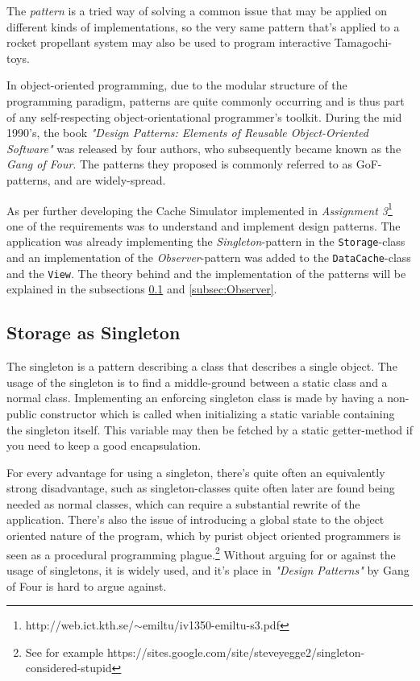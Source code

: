 \documentclass[a4paper]{scrreprt}
\begin{document}
The \textit{pattern} is a tried way of solving a common issue that may be applied on different kinds of implementations, so the very same pattern that's applied to a rocket propellant system may also be used to program interactive Tamagochi-toys.

In object-oriented programming, due to the modular structure of the programming paradigm, patterns are quite commonly occurring and is thus part of any self-respecting object-orientational programmer's toolkit. During the mid 1990's, the book \textit{"Design Patterns: Elements of Reusable Object-Oriented Software"} was released by four authors, who subsequently became known as the \textit{Gang of Four}. The patterns they proposed is commonly referred to as GoF-patterns, and are widely-spread.

As per further developing the Cache Simulator implemented in \textit{Assignment 3}\footnote{http://web.ict.kth.se/$\sim$emiltu/iv1350-emiltu-s3.pdf} one of the requirements was to understand and implement design patterns. The application was already implementing the \textit{Singleton}-pattern in the \texttt{Storage}-class and an implementation of the \textit{Observer}-pattern was added to the \texttt{DataCache}-class and the \texttt{View}. The theory behind and the implementation of the patterns will be explained in the subsections \ref{subsec:Singleton} and \ref{subsec:Observer}.

\subsection{Storage as Singleton}
\label{subsec:Singleton}

The singleton is a pattern describing a class that describes a single object. The usage of the singleton is to find a middle-ground between a static class and a normal class. Implementing an enforcing singleton class is made by having a non-public constructor which is called when initializing a static variable containing the singleton itself. This variable may then be fetched by a static getter-method if you need to keep a good encapsulation.

For every advantage for using a singleton, there's quite often an equivalently strong disadvantage, such as singleton-classes quite often later are found being needed as normal classes, which can require a substantial rewrite of the application. There's also the issue of introducing a global state to the object oriented nature of the program, which by purist object oriented programmers is seen as a procedural programming plague.\footnote{See for example https://sites.google.com/site/steveyegge2/singleton-considered-stupid} Without arguing for or against the usage of singletons, it is widely used, and it's place in \textit{"Design Patterns"} by Gang of Four is hard to argue against.
\end{document}
